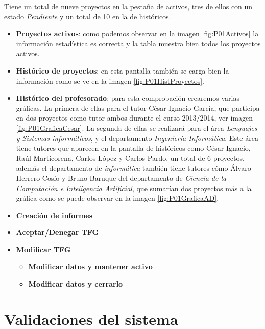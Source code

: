 Tiene un total de nueve proyectos en la pestaña de activos, tres de ellos con un estado \emph{Pendiente} y un total de 10 en la de históricos.

\begin{itemize}
	\item \textbf{Proyectos activos}: como podemos observar en la imagen \ref{fig:P01Activos} la información estadística es correcta y la tabla muestra bien todos los proyectos activos.
	\item \textbf{Histórico de proyectos}: en esta pantalla también se carga bien la información como se ve en la imagen \ref{fig:P01HistProyectos}.
	\item \textbf{Histórico del profesorado}: para esta comprobación crearemos varias gráficas. La primera de ellas para el tutor César Ignacio García, que participa en dos proyectos como tutor ambos durante el curso 2013/2014, ver imagen \ref{fig:P01GraficaCesar}. La segunda de ellas se realizará para el área \emph{Lenguajes y Sistemas informáticos}, y el departamento \emph{Ingeniería Informática}. Este área tiene tutores que aparecen en la pantalla de históricos como César Ignacio, Raúl Marticorena, Carlos López y Carlos Pardo, un total de 6 proyectos, además el departamento de \emph{informática} también tiene tutores cómo Álvaro Herrero Cosío y Bruno Baruque del departamento de \emph{Ciencia de la Computación e Inteligencia Artificial}, que sumarían dos proyectos más a la gráfica como se puede observar en la imagen \ref{fig:P01GraficaAD}.
	\item \textbf{Creación de informes}
	\item \textbf{Aceptar/Denegar TFG}
	\item \textbf{Modificar TFG}
		\begin{itemize}
				\item \textbf{Modificar datos y mantener activo}
				\item \textbf{Modificar datos y cerrarlo}
		\end{itemize}

\end{itemize}

\section{Validaciones del sistema}

